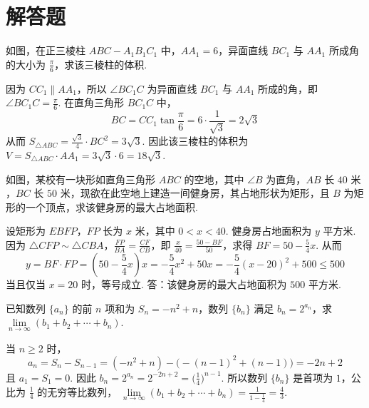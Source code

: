 \section{解答题}

\begin{problem}
如图，在正三棱柱 \( ABC-A_{1}B_{1}C_{1} \) 中，\( AA_{1}=6 \)，异面直线 \(BC_{1}\) 与 \(AA_{1}\) 所成角的大小为 \( \frac{\pi}{6} \)，求该三棱柱的体积.

\end{problem}

\begin{solution}
因为 \(CC_{1}\parallel AA_{1}\)，所以 \(\angle BC_{1}C\) 为异面直线 \(BC_{1}\) 与 \(AA_{1}\) 所成的角，即 \(\angle BC_{1}C=\frac{\pi}{6}\).
在直角三角形 \(BC_{1}C\) 中，
\[
BC=CC_{1}\tan\frac{\pi}{6}=6\cdot\frac{1}{\sqrt{3}}=2\sqrt{3}
\]
从而 \(S_{\triangle ABC}=\frac{\sqrt{3}}{4}\cdot BC^{2}=3\sqrt{3}\). 因此该三棱柱的体积为 \(V=S_{\triangle ABC}\cdot AA_{1}=3\sqrt{3}\cdot 6=18\sqrt{3}\).
\end{solution}

\begin{problem}
如图，某校有一块形如直角三角形 \(ABC\) 的空地，其中 \( \angle B \) 为直角，\(AB\) 长 \(40\text{ 米}\)，\(BC\) 长 \(50\text{ 米}\)，现欲在此空地上建造一间健身房，其占地形状为矩形，且 \(B\) 为矩形的一个顶点，求该健身房的最大占地面积.

\end{problem}

\begin{solution}
设矩形为 \(EBFP\)，\(FP\) 长为 \(x\text{ 米}\)，其中 \(0<x<40\).
健身房占地面积为 \(y\text{ 平方米}\). 因为 \(\triangle CFP\sim\triangle CBA\)，\(\frac{FP}{BA}=\frac{CF}{CB}\)，即 \(\frac{x}{40}=\frac{50-BF}{50}\)，求得 \(BF=50-\frac{5}{4}x\).
从而
\[
y=BF\cdot FP=\left(50-\frac{5}{4}x\right)x=-\frac{5}{4}x^2+50x=-\frac{5}{4}(x-20)^2+500\le 500
\]
当且仅当 \(x=20\) 时，等号成立.
答：该健身房的最大占地面积为 \(500\text{ 平方米}\).
\end{solution}

\begin{problem}
已知数列 \( \{a_n\} \) 的前 \( n \) 项和为 \( S_n = -n^2 + n \)，数列 \( \{b_n\} \) 满足 \( b_n = 2^{a_n} \)，求 \( \lim\limits_{n \to \infty} (b_1 + b_2 + \cdots + b_n) \).
\end{problem}

\begin{solution}
当 \(n\ge 2\) 时，
\[
a_n=S_n-S_{n-1}=(-n^{2}+n)-\bigl(-(n-1)^{2}+(n-1)\bigr)=-2n+2
\]
且 \(a_1=S_1=0\). 因此 \(b_n=2^{a_n}=2^{-2n+2}=\bigl(\frac14\bigr)^{n-1}\). 所以数列 \(\{b_n\}\) 是首项为 \(1\)，公比为 \(\frac14\) 的无穷等比数列，
\(\lim\limits_{n\to\infty}(b_1+b_2+\cdots+b_n)=\frac{1}{1-\frac14}=\frac43\).
\end{solution}

